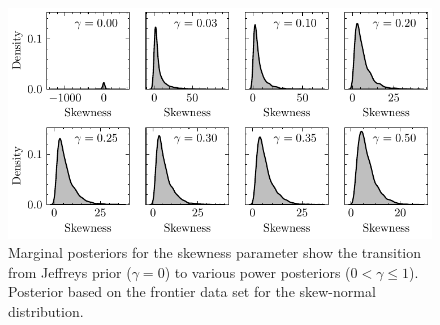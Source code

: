 \documentclass[12pt]{article}
\begin{document}
\begin{figure}
\begin{center}
\includegraphics{imgs/Jeffreys.pdf}
\end{center}
\caption{Marginal posteriors for the skewness parameter show the transition from Jeffreys prior ($\gamma=0$) to various power posteriors ($0<\gamma\leq1$).  Posterior based on the frontier data set for the skew-normal distribution. }\label{fig:skew_jeff_powpos}
\end{figure}
\end{document}
